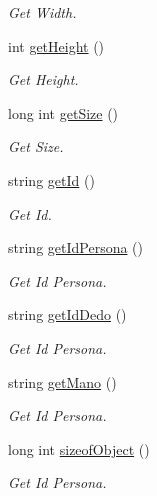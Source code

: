 \begin{DoxyCompactItemize}
\begin{DoxyCompactList}\small\item\em Get Width. \end{DoxyCompactList}\item 
int \hyperlink{classImagen_a1f243282c3f962c9694b53bc9106215b}{get\+Height} ()
\begin{DoxyCompactList}\small\item\em Get Height. \end{DoxyCompactList}\item 
long int \hyperlink{classImagen_afa3177842fed7750c8c51eeeaf108adb}{get\+Size} ()
\begin{DoxyCompactList}\small\item\em Get Size. \end{DoxyCompactList}\item 
string \hyperlink{classImagen_a4cac81ed0243f264dcbaae552b936038}{get\+Id} ()
\begin{DoxyCompactList}\small\item\em Get Id. \end{DoxyCompactList}\item 
string \hyperlink{classImagen_a6fe8c566e03b1c6e2d6818b1886ad522}{get\+Id\+Persona} ()
\begin{DoxyCompactList}\small\item\em Get Id Persona. \end{DoxyCompactList}\item 
string \hyperlink{classImagen_af8f9c814f372583821f412e2475e9fda}{get\+Id\+Dedo} ()
\begin{DoxyCompactList}\small\item\em Get Id Persona. \end{DoxyCompactList}\item 
string \hyperlink{classImagen_a687160f46f2e80fee30dac0955268c39}{get\+Mano} ()
\begin{DoxyCompactList}\small\item\em Get Id Persona. \end{DoxyCompactList}\item 
long int \hyperlink{classImagen_afae009c9516b1d67bf7aca237f6ef403}{sizeof\+Object} ()
\begin{DoxyCompactList}\small\item\em Get Id Persona. \end{DoxyCompactList}\end{DoxyCompactItemize}

